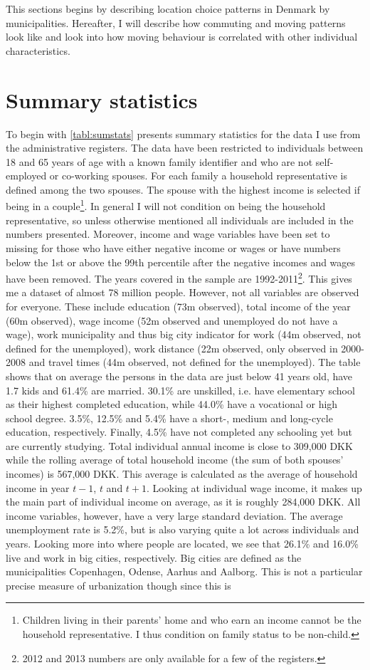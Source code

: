 This sections begins by describing location choice patterns in Denmark by municipalities. Hereafter, I will describe how commuting and moving patterns look like and look into how moving behaviour is correlated with other individual characteristics.

\section{Summary statistics}
To begin with \autoref{tabl:sumstats} presents summary statistics for the data I use from the administrative registers. The data have been restricted to individuals between 18 and 65 years of age with a known family identifier and who are not self-employed or co-working spouses. For each family a household representative is defined among the two spouses. The spouse with the highest income is selected if being in a couple\footnote{Children living in their parents' home and who earn an income cannot be the household representative. I thus condition on family status to be non-child.}. In general I will not condition on being the household representative, so unless otherwise mentioned all individuals are included in the numbers presented. Moreover, income and wage variables have been set to missing for those who have either negative income or wages or have numbers below the 1st or above the 99th percentile after the negative incomes and wages have been removed. The years covered in the sample are 1992-2011\footnote{2012 and 2013 numbers are only available for a few of the registers.}. This gives me a dataset of almost 78 million people. However, not all variables are observed for everyone. These include education (73m observed), total income of the year (60m observed), wage income (52m observed and unemployed do not have a wage), work municipality and thus big city indicator for work (44m observed, not defined for the unemployed), work distance (22m observed, only observed in 2000-2008 and travel times (44m observed, not defined for the unemployed). The table shows that on average the persons in the data are just below 41 years old, have 1.7 kids and 61.4\% are married. 30.1\% are unskilled, i.e. have elementary school as their highest completed education, while 44.0\% have a vocational or high school degree. 3.5\%, 12.5\% and 5.4\% have a short-, medium and long-cycle education, respectively. Finally, 4.5\% have not completed any schooling yet but are currently studying. Total individual annual income is close to 309,000 DKK while the rolling average of total household income (the sum of both spouses' incomes) is 567,000 DKK. This average is calculated as the average of household income in year $t-1$, $t$ and $t+1$. Looking at individual wage income, it makes up the main part of individual income on average, as it is roughly 284,000 DKK. All income variables, however, have a very large standard deviation. The average unemployment rate is 5.2\%, but is also varying quite a lot across individuals and years. Looking more into where people are located, we see that 26.1\% and 16.0\% live and work in big cities, respectively. Big cities are defined as the municipalities Copenhagen, Odense, Aarhus and Aalborg. This is not a particular precise measure of urbanization though since this is 